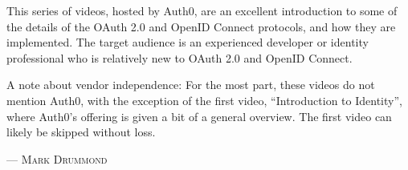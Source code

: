 This series of videos, hosted by Auth0, are an excellent introduction to some of the details of the OAuth 2.0 and OpenID Connect protocols, and how they are implemented. The target audience is an experienced developer or identity professional who is relatively new to OAuth 2.0 and OpenID Connect.

A note about vendor independence: For the most part, these videos do not mention Auth0, with the exception of the first video, “Introduction to Identity”, where Auth0’s offering is given a bit of a general overview. The first video can likely be skipped without loss.
  
\setlength{\parindent}{0cm}\par\textsc{ --- Mark Drummond }\par\vspace{12pt}\setlength{\parindent}{15pt}
